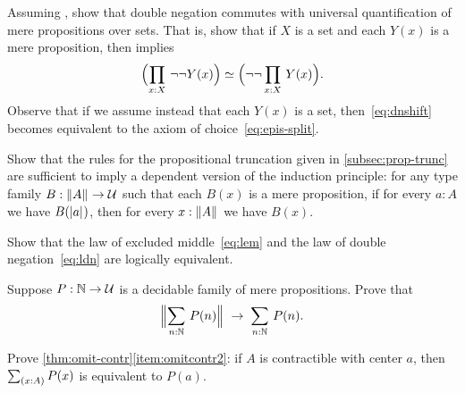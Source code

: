 \begin{ex}
  Assuming \LEM{}, show that double negation commutes with universal quantification of mere propositions over sets.
  That is, show that if $X$ is a set and each $Y(x)$ is a mere proposition, then \LEM{} implies
  \begin{equation}
    \eqv{\Parens{\prd{x:X} \neg\neg Y(x)}}{\Parens{\neg\neg \prd{x:X} Y(x)}}.\label{eq:dnshift}
  \end{equation}
  Observe that if we assume instead that each $Y(x)$ is a set, then~\eqref{eq:dnshift} becomes equivalent to the axiom of choice~\eqref{eq:epis-split}.
\end{ex}

\begin{ex}\label{ex:prop-trunc-ind}
  Show that the rules for the propositional truncation given in \autoref{subsec:prop-trunc} are sufficient to imply a dependent version of the induction principle: for any type family $B:\mathopen{}\left\Vert A\right\Vert_{}\mathclose{} \to \mathcal{U}$ such that each $B(x)$ is a mere proposition, if for every $a:A$ we have $B(\mathopen{}\left|a\right|_{}^{}\mathclose{})$, then for every $x:\mathopen{}\left\Vert A\right\Vert_{}\mathclose{}$ we have $B(x)$.
\end{ex}

\begin{ex}\label{ex:lem-ldn}
  Show that the law of excluded middle~\eqref{eq:lem} and the law of double negation~\eqref{eq:ldn} are logically equivalent.
\end{ex}

\begin{ex}\label{ex:decidable-choice}
  Suppose $P:\mathbb{N}\to\mathcal{U}$ is a decidable family of mere propositions.
  Prove that
  \[ \Brck{\sm{n:\nat} P(n)} \;\to\; \sm{n:\nat}P(n).\]
\end{ex}

\begin{ex}\label{ex:omit-contr2}
  Prove \autoref{thm:omit-contr}\ref{item:omitcontr2}: if $A$ is contractible with center $a$, then $\sm{x:A} P(x)$ is equivalent to $P(a)$.
\end{ex}


